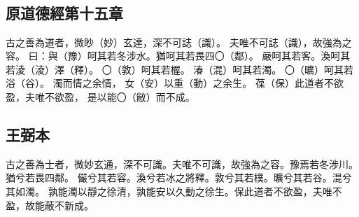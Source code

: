 ﻿%
%

\chapter{~}

\section{原道德經第十五章}

\begin{withgezhu}

\zhsong


\colorbox{adding-color}{古之善為道者，微眇（\textcolor{tongjia-color}{妙}）玄達}，深不可誌（\textcolor{tongjia-color}{識}）。
夫唯不可誌（\textcolor{tongjia-color}{識}），故強為之容。
曰：與（\textcolor{tongjia-color}{豫}）呵其若冬\colorbox{adding-color}{涉水。猶呵其若}畏四〇（\textcolor{tongjia-color}{鄰}）。
\colorbox{adding-color}{嚴呵}其若客。渙呵其若淩（\textcolor{tongjia-color}{淩}）澤（\textcolor{tongjia-color}{釋}）。
〇（\textcolor{tongjia-color}{敦}）呵其若楃。
湷（\textcolor{tongjia-color}{混}）\colorbox{adding-color}{呵其若濁}。
〇（\textcolor{tongjia-color}{曠}）\colorbox{adding-color}{呵其}若浴（\textcolor{tongjia-color}{谷}）。
濁而情之余情，
女（\textcolor{tongjia-color}{安}）以重（\textcolor{tongjia-color}{動}）之余生。
葆（\textcolor{tongjia-color}{保}）此道者\colorbox{missing-color}{不}欲盈，夫唯不欲\textcolor{wangbi-color}{盈}，
\colorbox{adding-color}{是以能}〇（\textcolor{tongjia-color}{敝}）\colorbox{adding-color}{而不}成。

\end{withgezhu}

\section{王弼本}

\begin{withgezhu}

\zhsong

古之善為士者，微妙玄通，深不可識。夫唯不可識，故強為之容。豫焉若冬涉川。猶兮若畏四鄰。
儼兮其若容。渙兮若冰之將釋。敦兮其若樸。曠兮其若谷。混兮其如濁。
孰能濁以靜之徐清，孰能安以久動之徐生。保此道者不欲盈，夫唯不盈，故能蔽不新成。

\end{withgezhu}
